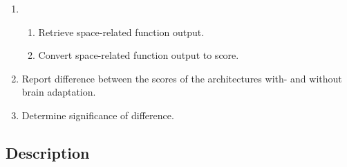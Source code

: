 \begin{enumerate}
    \item \begin{enumerate}
        \item Retrieve space-related function output.
        \item Convert space-related function output to score.
    \end{enumerate}
    \item Report difference between the scores of the architectures with- and without brain adaptation.
    \item Determine significance of difference.
\end{enumerate}

\subsection{Description}\label{subsec:description}
